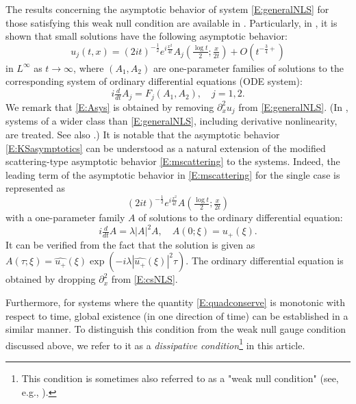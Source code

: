 \documentclass[11pt,a4paper,oneside]{amsart}
\theoremstyle{plain}
\theoremstyle{remark}
\numberwithin{equation}{section}
\def\({\left(}
\def\){\right)}
\theoremstyle{definition}
\begin{document}
The results concerning the asymptotic behavior of system \eqref{E:generalNLS} for those satisfying this weak null condition are available in \cite{NST,KS,M3,U}. Particularly, in \cite{KS}, it is shown that small solutions have the following asymptotic behavior:
\begin{equation}\label{E:KSasymptotics}
	u_j(t,x) = (2it)^{-\frac12} e^{i\frac{x^2}{4t}} A_j \( \tfrac{\log t}{2} ; \tfrac{x}{2t} \) + O(t^{-\frac34+})
\end{equation}
in $L^\infty$ as $t\to\infty$,
where $(A_1,A_2)$ are one-parameter families of solutions to the corresponding system of
ordinary differential equations (ODE system):
\begin{equation}\label{E:Asys}
	i \tfrac{d}{dt} A_j	= 	 F_j(A_1,A_2) , \quad j=1,2.
\end{equation}
We remark that \eqref{E:Asys} is 
obtained by removing $\partial_x^2 u_j$ from \eqref{E:generalNLS}. (In \cite{KS}, systems of a wider class than \eqref{E:generalNLS}, including derivative nonlinearity, are treated. See also  \cite{HNS,KN,NST}.) 
It is notable that the asymptotic behavior \eqref{E:KSasymptotics} can be understood as a natural extension of the modified scattering-type asymptotic behavior \eqref{E:mscattering} to the systems.
Indeed, the leading term of the asymptotic behavior in \eqref{E:mscattering} for the single case is represented as 
\[
	 (2it)^{-\frac12} e^{i\frac{x^2}{4t}} A \( \tfrac{\log t}{2} ; \tfrac{x}{2t} \)
\]
with a one-parameter family $A$ of solutions  to the ordinary differential equation:
\[
	i\tfrac{d}{dt} A=\lambda |A|^2 A, \quad A(0;\xi) = \widehat{u_+}(\xi).
\]
It can be verified from the fact that the solution is given as $A(\tau;\xi)=\widehat{u_+}(\xi) \exp (-i\lambda |\widehat{u_+}(\xi)|^2 \tau)$.
The ordinary differential equation is obtained by dropping $\partial_x^2$ from \eqref{E:csNLS}.

Furthermore, for systems where the quantity \eqref{E:quadconserve} is monotonic with respect to time, global existence (in one direction of time) can be established in a similar manner.
To distinguish this condition from the weak null gauge condition discussed above, we refer to it as a \emph{dissipative condition}\footnote{This condition is sometimes also referred to as a "weak null condition" (see, e.g., \cite{KaSu}).} in this article.
\end{document}
